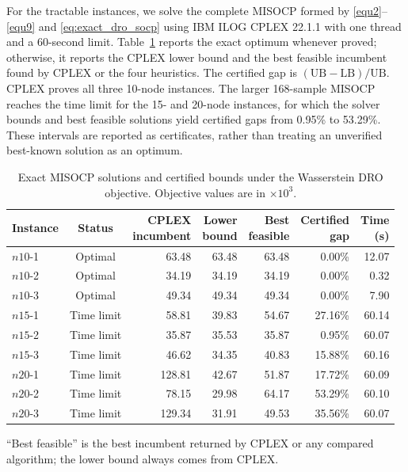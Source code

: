 \documentclass[preprint,12pt,authoryear]{elsarticle}
\theoremstyle{definition}
\begin{document}
{For the tractable instances, we solve the complete MISOCP formed by \eqref{equ2}--\eqref{equ9} and \eqref{eq:exact_dro_socp} using IBM ILOG CPLEX 22.1.1 with one thread and a 60-second limit. 
Table~\ref{tab:exact_dro_certification} reports the exact optimum whenever proved; 
otherwise, it reports the CPLEX lower bound and the best feasible incumbent found by CPLEX or the four heuristics. 
The certified gap is $(\mathrm{UB}-\mathrm{LB})/\mathrm{UB}$. CPLEX proves all three 10-node instances. The larger 168-sample MISOCP reaches the time limit for the 15- and 20-node instances, for which the solver bounds and best feasible solutions yield certified gaps from 0.95\% to 53.29\%. These intervals are reported as certificates, rather than treating an unverified best-known solution as an optimum.

\begin{table}[htbp]
\centering
\caption{Exact MISOCP solutions and certified bounds under the Wasserstein DRO objective. Objective values are in $\times10^3$.}
\label{tab:exact_dro_certification}
\footnotesize
\setlength{\tabcolsep}{4.5pt}
\begin{tabular}{@{}lcrrrrr@{}}
\toprule
Instance & Status & \shortstack{CPLEX\\incumbent} & \shortstack{Lower\\bound} & \shortstack{Best\\feasible} & \shortstack{Certified\\gap} & \shortstack{Time\\(s)} \\
\midrule
$n10$-1 & Optimal & 63.48 & 63.48 & 63.48 & 0.00\% & 12.07 \\
$n10$-2 & Optimal & 34.19 & 34.19 & 34.19 & 0.00\% & 0.32 \\
$n10$-3 & Optimal & 49.34 & 49.34 & 49.34 & 0.00\% & 7.90 \\
$n15$-1 & Time limit & 58.81 & 39.83 & 54.67 & 27.16\% & 60.14 \\
$n15$-2 & Time limit & 35.87 & 35.53 & 35.87 & 0.95\% & 60.07 \\
$n15$-3 & Time limit & 46.62 & 34.35 & 40.83 & 15.88\% & 60.16 \\
$n20$-1 & Time limit & 128.81 & 42.67 & 51.87 & 17.72\% & 60.09 \\
$n20$-2 & Time limit & 78.15 & 29.98 & 64.17 & 53.29\% & 60.10 \\
$n20$-3 & Time limit & 129.34 & 31.91 & 49.53 & 35.56\% & 60.07 \\
\bottomrule
\end{tabular}
\parbox{0.97\textwidth}{\footnotesize ``Best feasible'' is the best incumbent returned by CPLEX or any compared algorithm; the lower bound always comes from CPLEX.}
\end{table}

}
\end{document}
